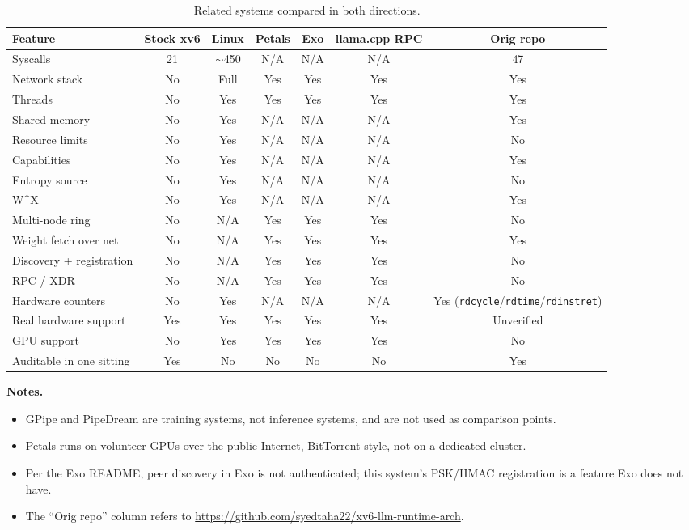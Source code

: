 \documentclass[11pt,a4paper]{article}
\begin{document}
\begin{table}[H]
\centering
\small
\begin{tabular}{lcccccc}
\toprule
\textbf{Feature} & \textbf{Stock xv6} & \textbf{Linux} & \textbf{Petals} & \textbf{Exo} & \textbf{llama.cpp RPC} & \textbf{Orig repo} \\
\midrule
Syscalls              & 21     & $\sim$450 & N/A   & N/A   & N/A   & 47 \\
Network stack         & No     & Full      & Yes   & Yes   & Yes   & Yes \\
Threads               & No     & Yes       & Yes   & Yes   & Yes   & Yes \\
Shared memory         & No     & Yes       & N/A   & N/A   & N/A   & Yes \\
Resource limits       & No     & Yes       & N/A   & N/A   & N/A   & No \\
Capabilities          & No     & Yes       & N/A   & N/A   & N/A   & Yes \\
Entropy source        & No     & Yes       & N/A   & N/A   & N/A   & No \\
W\^{}X                & No     & Yes       & N/A   & N/A   & N/A   & Yes \\
Multi-node ring       & No     & N/A       & Yes   & Yes   & Yes   & No \\
Weight fetch over net & No     & N/A       & Yes   & Yes   & Yes   & Yes \\
Discovery + registration & No  & N/A       & Yes   & Yes   & Yes   & No \\
RPC / XDR             & No     & N/A       & Yes   & Yes   & Yes   & No \\
Hardware counters     & No     & Yes       & N/A   & N/A   & N/A   & Yes (\texttt{rdcycle}/\texttt{rdtime}/\texttt{rdinstret}) \\
Real hardware support & Yes    & Yes       & Yes   & Yes   & Yes   & Unverified \\
GPU support           & No     & Yes       & Yes   & Yes   & Yes   & No \\
Auditable in one sitting & Yes & No        & No    & No    & No    & Yes \\
\bottomrule
\end{tabular}
\caption{Related systems compared in both directions.}
\end{table}

\noindent\textbf{Notes.}
\begin{itemize}[leftmargin=*]
\item GPipe and PipeDream are training systems, not inference systems, and are not used as comparison points.
\item Petals runs on volunteer GPUs over the public Internet, BitTorrent-style, not on a dedicated cluster.
\item Per the Exo README, peer discovery in Exo is not authenticated; this system's PSK/HMAC registration is a feature Exo does not have.
\item The ``Orig repo'' column refers to \url{https://github.com/syedtaha22/xv6-llm-runtime-arch}.
\end{itemize}
\end{document}
